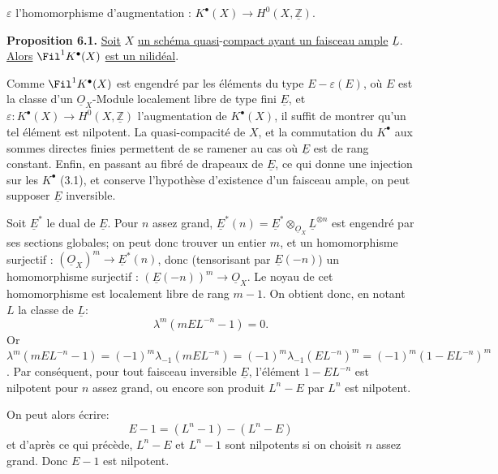 
$\varepsilon$ l'homomorphisme d'augmentation : $K^{\bullet}(X)\longrightarrow H^0(X,\underline{\mathbb Z})$.

\textbf{Proposition 6.1.} \uline{Soit} $X$ \uline{un schéma quasi}-\uline{compact ayant un faisceau ample} $\underline{L}$. \uline{Alors} $\Fil^1K^{\bullet}(X)$ \uline{est un nilidéal}.

Comme $\Fil^1K^{\bullet}(X)$ est engendré par les éléments du type $E-\varepsilon(E)$, où $E$ est la classe d'un $\underline{O}_X$-Module localement libre de type fini $\underline{E}$, et $\varepsilon:K^{\bullet}(X)\to H^0(X,\underline{\mathbb Z})$ l'augmentation de $K^{\bullet}(X)$, il suffit de montrer qu'un tel élément est nilpotent. La quasi-compacité de $X$, et la commutation du $K^{\bullet}$ aux sommes directes finies permettent de se ramener au cas où $\underline{E}$ est de rang constant. Enfin, en passant au fibré de drapeaux de $\underline{E}$, ce qui donne une injection sur les $K^{\bullet}$ (3.1), et conserve l'hypothèse d'existence d'un faisceau ample, on peut supposer $\underline{E}$ inversible.

Soit $\underline{E}^*$ le dual de $\underline{E}$. Pour $n$ assez grand, $\underline{E}^*(n)=\underline{E}^*\otimes_{\underline{O}_X}\underline{L}^{\otimes n}$ est engendré par ses sections globales; on peut donc trouver un entier $m$, et un homomorphisme surjectif : $(\underline{O}_X)^m\longrightarrow \underline{E}^*(n)$, donc (tensorisant par $\underline{E}(-n)$) un homomorphisme surjectif : $(\underline{E}(-n))^m\longrightarrow\underline{O}_X$. Le noyau de cet homomorphisme est localement libre de rang $m-1$. On obtient donc, en notant $L$ la classe de $\underline{L}$:
\[
  \lambda^m(mEL^{-n}-1)=0 .
\]
Or $\lambda^m(mEL^{-n}-1)=(-1)^m\lambda_{-1}(mEL^{-n})=(-1)^m\lambda_{-1}(EL^{-n})^m=(-1)^m(1-EL^{-n})^m$. Par conséquent, pour tout faisceau inversible $\underline{E}$, l'élément $1-EL^{-n}$ est nilpotent pour $n$ assez grand, ou encore son produit $L^n-E$ par $L^n$ est nilpotent.

On peut alors écrire:
\[
  E-1=(L^n-1)-(L^n-E)
\]
et d'après ce qui précède, $L^n-E$ et $L^n-1$ sont nilpotents si on choisit $n$ assez grand. Donc $E-1$ est nilpotent.


